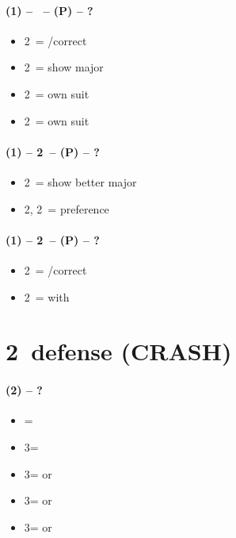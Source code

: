 \documentclass[12pt, a4paper]{report}
\begin{document}
{{        \subsubsection*{(1\ntx) -- \dbl\ -- (P) -- ?}
        \begin{itemize}
            \item 2\clubs\ = \pass/correct
            \item 2\diams\ = show major
            \item 2\hearts\ = own suit
            \item 2\spades\ = own suit
        \end{itemize}

        \subsubsection*{(1\ntx) -- 2\clubs\ -- (P) -- ?}
        \begin{itemize}
            \item 2\diams\ = show better major
            \item 2\hearts, 2\spades\ = preference
        \end{itemize}

        \subsubsection*{(1\ntx) -- 2\diams\ -- (P) -- ?}
        \begin{itemize}
            \item 2\hearts\ = \pass/correct
            \item 2\spades\ = \inv with \hearts
        \end{itemize}

    }

    \chapter*{\colorbox{Plum!30}{2\ntch\ defense (CRASH)}}
     {
        \subsubsection*{(2\nt) -- ?}
        \begin{itemize}
            \item \dbl = \hearts
            \item 3\clubs = \spades
            \item 3\diams = \twosuit{\clubs}{\spades} or \twosuit{\diams}{\hearts}
            \item 3\hearts = \twosuit{\clubs}{\diams} or \twosuit{\hearts}{\spades}
            \item 3\spades = \twosuit{\clubs}{\hearts} or \twosuit{\diams}{\spades}
        \end{itemize}

}}
\end{document}

